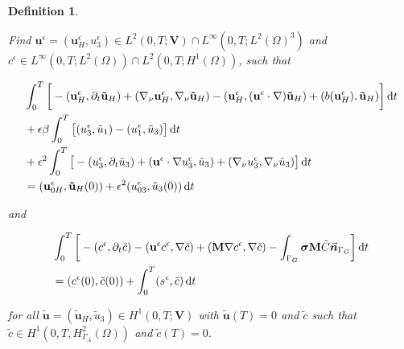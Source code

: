 \documentclass[11pt]{article}
\newtheorem{definition}{Definition}
\newcommand*\diff{\mathop{}\!\mathrm{d}}
\begin{document}
\begin{definition} \label{definitionanisotropicWF}
  
Find $\mathbf{u}^\epsilon = (\mathbf{u}^\epsilon_H, u^\epsilon_3) \in L^2 (0,T ; \mathbf{V}) \cap L^\infty (0, T; L^2 (\Omega)^3)$ and $c^\epsilon \in L^\infty (0,T; L^2(\Omega)) \cap L^2 (0,T; H^1(\Omega))$, such that
  
  \begin{equation}
    \begin{split}
      & \int_0^T \bigg [ -(\mathbf{u}^\epsilon_H, \partial_t \mathbf{\tilde{u}}_H) + (\nabla_\nu \mathbf{u}^\epsilon_H, \nabla_\nu \mathbf{\tilde{u}}_H) - (\mathbf{u}^\epsilon_H, (\mathbf{u}^\epsilon \cdot \nabla) \mathbf{\tilde{u}}_H) + (b(\mathbf{u}^\epsilon_H), \mathbf{\tilde{u}}_H) \bigg ] \diff t \\
      & + \epsilon \beta \int_0 ^ T \big [ (u_3 ^\epsilon, \tilde{u}_1) - (u_1^\epsilon, \tilde{u}_3) \big ] \diff t\\
      & + \epsilon^2 \int _0 ^ T \big [ -(u_3^\epsilon, \partial_t \tilde{u}_3) +(\mathbf{u}^\epsilon \cdot \nabla u_3 ^ \epsilon, \tilde{u}_3) + (\nabla_\nu u_3^\epsilon, \nabla_\nu \tilde{u}_3) \big ] \diff t \\
      & = (\mathbf{u}^\epsilon_{0H}, \mathbf{\tilde{u}}_H(0)) + \epsilon^2 (u_{03}^\epsilon, \tilde{u}_3 (0)) \diff t \raisetag{20pt} \label{anisotropicWF_U}
    \end{split}
  \end{equation}
  
  and
  
  \begin{equation}
    \begin{split}
      & \int_0^T \bigg [ - (c^\epsilon, \partial_t \tilde{c}) -(\mathbf{u}^\epsilon c^\epsilon, \nabla \tilde{c}) + (\mathbf{M} \nabla c^\epsilon, \nabla \tilde{c}) - \int_{\Gamma_G} \boldsymbol{\sigma} \mathbf{M} \tilde{C} \vec{\boldsymbol{n}}_{\Gamma_G} \bigg ] \diff t \\
      & =  (c^\epsilon (0), \tilde{c} (0)) + \int_0^T (s^\epsilon,\tilde{c}) \diff t \raisetag{20pt} \label{anisotropicWF_C}
    \end{split}
  \end{equation}
  
  for all $\mathbf{\tilde{u}} = (\mathbf{\tilde{u}}_H, \tilde{u}_3) \in H^1 (0,T;\mathbf{V})$ with $\mathbf{\tilde{u}}(T) = 0$ and $\tilde{c}$ such that $\tilde{c} \in H^1 (0,T, H^2_{\Gamma_A} (\Omega))$ and $\tilde{c} (T) = 0$.
  
\end{definition}
\end{document}
